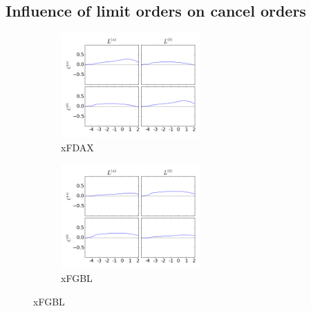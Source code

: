 \documentclass[a4paper,11pt]{article}
\begin{document}
\subsection{Influence of limit orders on cancel orders}
\label{LC}
\begin{figure}[H]
        \begin{subfigure}[b]{0.45\textwidth}
                \includegraphics[width=\textwidth,height=40mm]{xFDAXPA_PB_TA_TB_LA_LB_CA_CB__LALB-_CACBcausality.png}
                \caption{xFDAX}
        \end{subfigure}
        \begin{subfigure}[b]{0.45\textwidth}
                \includegraphics[width=\textwidth,height=40mm]{xFGBLPA_PB_TA_TB_LA_LB_CA_CB__LALB-_CACBcausality.png}
                \caption{xFGBL}
        \end{subfigure}
\end{figure}
\end{document}
